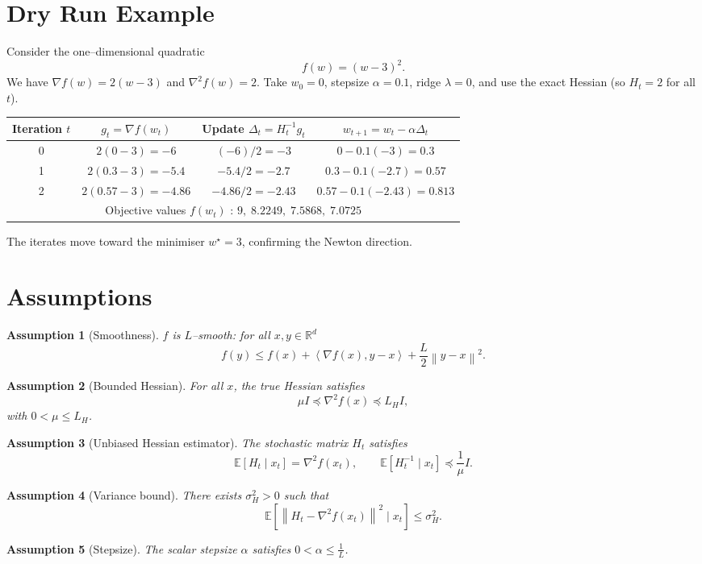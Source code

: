 \documentclass{article}
\newtheorem{assumption}{Assumption}
\newcommand{\E}{\mathbb{E}}
\newcommand{\R}{\mathbb{R}}
\newcommand{\norm}[1]{\left\lVert #1 \right\rVert}
\newcommand{\ip}[2]{\left\langle #1, #2 \right\rangle}
\begin{document}
\section*{Dry Run Example}
Consider the one–dimensional quadratic
\[
f(w)= (w-3)^{2}.
\]
We have $\nabla f(w)=2(w-3)$ and $\nabla^{2}f(w)=2$.  
Take $w_{0}=0$, stepsize $\alpha=0.1$, ridge $\lambda=0$, and use the exact Hessian (so $H_{t}=2$ for all $t$).

\begin{center}
\begin{tabular}{c|c|c|c}
Iteration $t$ & $g_{t}= \nabla f(w_{t})$ & Update $\Delta_{t}= H_{t}^{-1}g_{t}$ & $w_{t+1}=w_{t}-\alpha\Delta_{t}$\\\midrule
0 & $2(0-3)=-6$ & $(-6)/2=-3$ & $0-0.1(-3)=0.3$\\
1 & $2(0.3-3)=-5.4$ & $-5.4/2=-2.7$ & $0.3-0.1(-2.7)=0.57$\\
2 & $2(0.57-3)=-4.86$ & $-4.86/2=-2.43$ & $0.57-0.1(-2.43)=0.813$\\\midrule
\multicolumn{4}{c}{Objective values $f(w_{t})$ : $9,\;8.2249,\;7.5868,\;7.0725$}
\end{tabular}
\end{center}
The iterates move toward the minimiser $w^{\star}=3$, confirming the Newton direction.

\newpage
\section*{Assumptions}
\begin{assumption}[Smoothness]\label{ass:smooth}
$f$ is $L$–smooth: for all $x,y\in\R^{d}$
\[
f(y)\le f(x)+\ip{\nabla f(x)}{y-x}+\frac{L}{2}\norm{y-x}^{2}.
\]
\end{assumption}
\begin{assumption}[Bounded Hessian]\label{ass:hessian}
For all $x$, the true Hessian satisfies
\[
\mu I \preceq \nabla^{2}f(x) \preceq L_{H} I,
\]
with $0<\mu\le L_{H}$.
\end{assumption}
\begin{assumption}[Unbiased Hessian estimator]\label{ass:unbiased}
The stochastic matrix $H_{t}$ satisfies
\[
\E[H_{t}\mid x_{t}] = \nabla^{2}f(x_{t}),\qquad
\E[H_{t}^{-1}\mid x_{t}] \preceq \frac{1}{\mu}I .
\]
\end{assumption}
\begin{assumption}[Variance bound]\label{ass:variance}
There exists $\sigma_{H}^{2}>0$ such that
\[
\E\!\left[\norm{H_{t}-\nabla^{2}f(x_{t})}^{2}\mid x_{t}\right]\le\sigma_{H}^{2}.
\]
\end{assumption}
\begin{assumption}[Stepsize]\label{ass:stepsize}
The scalar stepsize $\alpha$ satisfies $0<\alpha\le \frac{1}{L}$.
\end{assumption}
\end{document}
